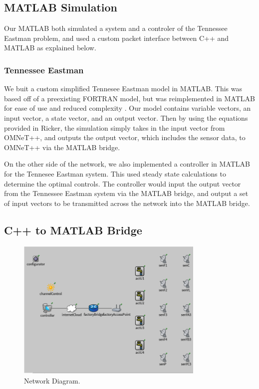 \subsection{MATLAB Simulation}
  Our MATLAB both simulated a system and a controler of the
  Tennessee Eastman problem, and used a custom packet interface
  between C++ and MATLAB as explained below.

\subsubsection{Tennessee Eastman}
  We buit a custom simplified Tennesee Eastman model in MATLAB.  
  This was based off of a preexisting FORTRAN model, but was
  reimplemented in MATLAB for ease of use and reduced complexity 
  .  Our model contains variable vectors, an
  input vector, a state vector, and an output vector. Then by 
  using the equations provided in Ricker, the
  simulation simply takes in the input vector from OMNeT++, and
  outputs the output vector, which includes the sensor data, to
  OMNeT++ via the MATLAB bridge.

  On the other side of the network, we also implemented a 
  controller in MATLAB for the Tennesee Eastman system.  This
  used steady state calculations to determine the optimal controls.
  The controller would input the output vector from the Tennessee
  Eastman system via the MATLAB bridge, and output a set of input
  vectors to be transmitted across the network into the MATLAB
  bridge.

\subsection{C++ to MATLAB Bridge}

\begin{figure}
        \centering
		\includegraphics[width=0.8\textwidth]{figs/network.png}
        \caption{Network Diagram.}
        \label{fig:network}        
\end{figure}
